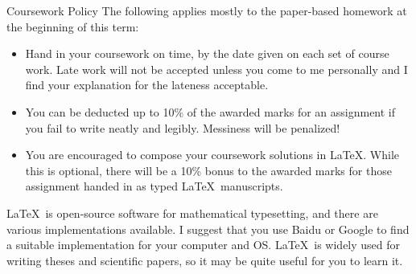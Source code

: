 \documentclass[smaller,hyperref={CJKbookmarks=true}]{beamer}
\begin{document}
\begin{spacing}{1.15}
\begin{frame}[t,squeeze]{Coursework Policy}
The following applies mostly to the paper-based homework at the
beginning of this term:
\begin{itemize}
  \item Hand in your coursework on time, by the date given on each set of
course work. Late work will not be accepted unless you come to me
personally and I find your explanation for the lateness acceptable.
  \item You can be deducted up to \textcolor[rgb]{1.00,0.00,0.00}{10\% of the awarded marks for an
assignment} if you fail to write neatly and legibly. Messiness will be
penalized!
  \item You are encouraged to compose your coursework solutions in \LaTeX.
While this is optional, there will be a \textcolor[rgb]{1.00,0.00,0.00}{10\% bonus to the awarded
marks} for those assignment handed in as typed \LaTeX ~manuscripts.
\end{itemize}
\LaTeX ~is open-source software for mathematical typesetting, and there
are various implementations available. I suggest that you use Baidu or
Google to find a suitable implementation for your computer and OS.
\LaTeX ~is widely used for writing theses and scientific papers, so it may
be quite useful for you to learn it.
\end{frame}
\end{spacing}
\end{document}
